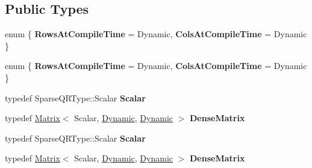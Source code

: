 \subsection*{Public Types}
\begin{DoxyCompactItemize}
\item 
\mbox{\label{struct_eigen_1_1_sparse_q_r_matrix_q_return_type_a9aec9e826a03efd4cccb8a66c7b9d46e}} 
enum \{ {\bfseries Rows\+At\+Compile\+Time} = Dynamic, 
{\bfseries Cols\+At\+Compile\+Time} = Dynamic
 \}
\item 
\mbox{\label{struct_eigen_1_1_sparse_q_r_matrix_q_return_type_aa68da696b92269b7d82bc6e208e888ef}} 
enum \{ {\bfseries Rows\+At\+Compile\+Time} = Dynamic, 
{\bfseries Cols\+At\+Compile\+Time} = Dynamic
 \}
\item 
\mbox{\label{struct_eigen_1_1_sparse_q_r_matrix_q_return_type_aec649b2f0533b4765b8c39b4c2283e35}} 
typedef Sparse\+Q\+R\+Type\+::\+Scalar {\bfseries Scalar}
\item 
\mbox{\label{struct_eigen_1_1_sparse_q_r_matrix_q_return_type_ac71399a3aabf19dcb8a33d0287a7f04b}} 
typedef \hyperlink{group___core___module_class_eigen_1_1_matrix}{Matrix}$<$ Scalar, \hyperlink{namespace_eigen_ad81fa7195215a0ce30017dfac309f0b2}{Dynamic}, \hyperlink{namespace_eigen_ad81fa7195215a0ce30017dfac309f0b2}{Dynamic} $>$ {\bfseries Dense\+Matrix}
\item 
\mbox{\label{struct_eigen_1_1_sparse_q_r_matrix_q_return_type_aec649b2f0533b4765b8c39b4c2283e35}} 
typedef Sparse\+Q\+R\+Type\+::\+Scalar {\bfseries Scalar}
\item 
\mbox{\label{struct_eigen_1_1_sparse_q_r_matrix_q_return_type_ac71399a3aabf19dcb8a33d0287a7f04b}} 
typedef \hyperlink{group___core___module_class_eigen_1_1_matrix}{Matrix}$<$ Scalar, \hyperlink{namespace_eigen_ad81fa7195215a0ce30017dfac309f0b2}{Dynamic}, \hyperlink{namespace_eigen_ad81fa7195215a0ce30017dfac309f0b2}{Dynamic} $>$ {\bfseries Dense\+Matrix}
\end{DoxyCompactItemize}
